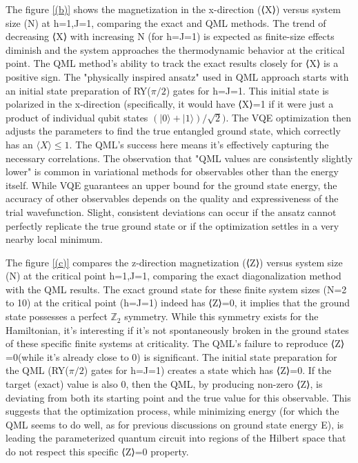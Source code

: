 \documentclass[pre,twocolumn,floatfix]{revtex4-1}
\begin{document}
The figure \ref{(b)} shows the magnetization in the x-direction (⟨X⟩) versus system size (N) at h=1,J=1, comparing the exact and QML methods. The trend of decreasing ⟨X⟩ with increasing N (for h=J=1) is expected as finite-size effects diminish and the system approaches the thermodynamic behavior at the critical point. The QML method's ability to track the exact results closely for ⟨X⟩ is a positive sign. The "physically inspired ansatz" used in QML approach starts with an initial state preparation of RY($\pi/2$) gates for h=J=1. This initial state is polarized in the x-direction (specifically, it would have ⟨X⟩=1 if it were just a product of individual qubit states $(|0⟩+|1⟩)/\sqrt2)$. The VQE optimization then adjusts the parameters to find the true entangled ground state, which correctly has an $⟨X⟩\leq1$. The QML's success here means it's effectively capturing the necessary correlations. The observation that "QML values are consistently slightly lower" is common in variational methods for observables other than the energy itself. While VQE guarantees an upper bound for the ground state energy, the accuracy of other observables depends on the quality and expressiveness of the trial wavefunction. Slight, consistent deviations can occur if the ansatz cannot perfectly replicate the true ground state or if the optimization settles in a very nearby local minimum.

The figure \ref{(c)} compares the z-direction magnetization (⟨Z⟩) versus system size (N) at the critical point h=1,J=1, comparing the exact diagonalization method with the QML results. The exact ground state for these finite system sizes (N=2 to 10) at the critical point (h=J=1) indeed has ⟨Z⟩=0, it implies that the ground state possesses a perfect $\mathbb{Z}_2$ symmetry. While this symmetry exists for the Hamiltonian, it's interesting if it's not spontaneously broken in the ground states of these specific finite systems at criticality. The QML's failure to reproduce ⟨Z⟩=0(while it's already close to 0) is significant. The initial state preparation for the QML (RY($\pi/2$) gates for h=J=1) creates a state which has ⟨Z⟩=0. If the target (exact) value is also 0, then the QML, by producing non-zero ⟨Z⟩, is deviating from both its starting point and the true value for this observable. This suggests that the optimization process, while minimizing energy (for which the QML seems to do well, as for previous discussions on ground state energy E), is leading the parameterized quantum circuit into regions of the Hilbert space that do not respect this specific ⟨Z⟩=0 property.
\end{document}
